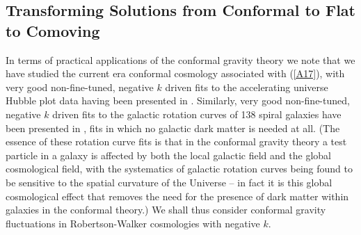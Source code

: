 \documentclass[aps]{revtex4}
\begin{document}
\subsection{Transforming Solutions from Conformal to Flat to Comoving}

In terms of practical applications of the conformal gravity theory we note that we have studied the current era conformal cosmology associated with (\ref{A17}), with very good non-fine-tuned, negative $k$  driven fits to the accelerating universe Hubble plot data having been presented in \cite{Mannheim2006,Mannheim2017}. Similarly, very good non-fine-tuned, negative $k$ driven fits  to the galactic rotation curves of 138 spiral galaxies have been presented in \cite{Mannheim2011b,Mannheim2012c,OBrien2012}, fits in which no galactic dark matter is needed at all. (The essence of these rotation curve fits is that in the conformal gravity theory a test particle in a galaxy is affected by both the local galactic field and the global cosmological field, with the systematics of galactic rotation curves being found to be sensitive to the spatial curvature of the Universe -- in fact it is this global cosmological effect that removes the need for the presence of dark matter within galaxies in the conformal theory.) We shall thus consider conformal gravity fluctuations in Robertson-Walker cosmologies with negative $k$.
\end{document}
